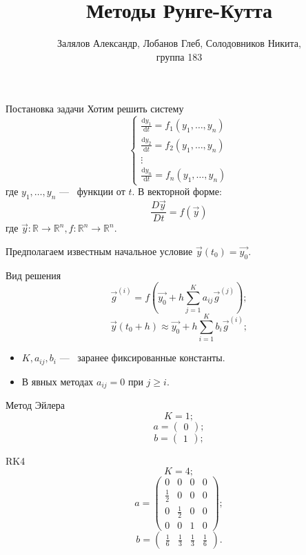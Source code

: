 \documentclass{beamer}
\title{Методы Рунге-Кутта}
\author{Залялов Александр, Лобанов Глеб, Солодовников Никита, \\ группа 183}
\date{}
\newcommand{\diff}{\mathrm{d}}
\begin{document}
\begin{frame}
	\titlepage
\end{frame}

\begin{frame}{Постановка задачи}
	Хотим решить систему
	\[ \begin{cases} 
		\frac{\diff y_1}{\diff t} = f_1(y_1, \ldots, y_n) \\
		\frac{\diff y_2}{\diff t} = f_2(y_1, \ldots, y_n) \\
		\vdots \\
		\frac{\diff y_n}{\diff t} = f_n(y_1, \ldots, y_n)
	\end{cases} \]
	где $y_1, \ldots, y_n$ ---~ функции от $t$. В векторной форме:
	\[\frac{D\vec{y}}{D t} = f(\vec{y}) \]
	где $\vec{y}:\mathbb{R} \to \mathbb{R}^n, f:\mathbb{R}^n \to \mathbb{R}^n$.

	Предполагаем известным начальное условие $\vec{y}(t_0) = \vec{y_0}$.
\end{frame}

\begin{frame}{Вид решения}
	\[\vec{g}^{(i)} = f\left(\vec{y_0} + h\sum_{j = 1}^K a_{ij}\vec{g}^{(j)}\right); \]
	\[\vec{y}(t_0 + h) \approx \vec{y_0} + h\sum_{i = 1}^K b_i \vec{g}^{(i)};  \]

	\begin{itemize}
		\item<1-> $K, a_{ij}, b_i$ ---~ заранее фиксированные константы.
		\item<2-> В явных методах $a_{ij} = 0$ при $j \ge i$.
	\end{itemize}
\end{frame}

\begin{frame}{Метод Эйлера}
\[ K = 1; \]
\[ a = \begin{pmatrix} 0 \end{pmatrix}; \]
\[ b = \begin{pmatrix} 1 \end{pmatrix}; \]
\end{frame}

\begin{frame}{RK4}
	\[ K = 4; \]
	\[ a = \begin{pmatrix} 
		0 & 0 & 0 & 0 \\
		\frac{1}{2} & 0 & 0 & 0 \\
		0 & \frac{1}{2} & 0 & 0 \\
		0 & 0 & 1 & 0
		\end{pmatrix}; \]
	\[ b = \begin{pmatrix} \frac{1}{6} & \frac{1}{3} & \frac{1}{3} & \frac{1}{6} \end{pmatrix}. \]
\end{frame}
\end{document}
